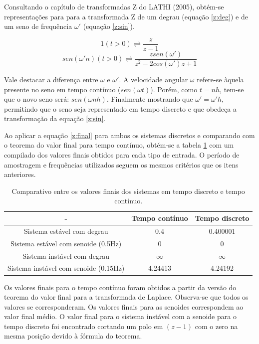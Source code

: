 Consultando o capítulo de transformadas Z do LATHI (2005), obtém-se representações para para a transformada Z de um degrau (equação \ref{z:deg}) e de um seno de frequência $\omega'$ (equação \ref{z:sin}).

\begin{equation} \label{z:deg}
    1 (t>0) \rightleftharpoons \frac{z}{z-1}
\end{equation}
\begin{equation} \label{z:sin}
   sen(\omega' n) (t>0) \rightleftharpoons \frac{z sen(\omega')}{z^2-2cos(\omega')z+1}
\end{equation}

Vale destacar a diferença entre $\omega$ e $\omega'$. A velocidade angular $\omega$ refere-se àquela presente no seno em tempo contínuo ($sen(\omega t)$). Porém, como $t = n h$, tem-se que o novo seno será: $sen(\omega n h)$. Finalmente mostrando que $\omega' = \omega' h$, permitindo que o seno seja representado em tempo discreto e que obedeça a transformação da equação \ref{z:sin}.

Ao aplicar a equação \ref{z:final} para ambos os sistemas discretos e comparando com o teorema do valor final para tempo contínuo, obtém-se a tabela \ref{table:1} com um compilado dos valores finais obtidos para cada tipo de entrada. O período de amostragem e frequências utilizados seguem os mesmos critérios que os itens anteriores.

\begin{table}[h]
\centering
\caption{Comparativo entre os valores finais dos sistemas em tempo discreto e tempo contínuo. }\label{table:1}
\begin{tabular}{c|cc}
 - & Tempo contínuo & Tempo discreto \\ \hline
Sistema estável com degrau & 0.4 & 0.400001  \\
Sistema estável com senoide (0.5Hz) & 0 & 0  \\
Sistema instável com degrau & $\infty$ & $\infty$  \\
Sistema instável com senoide (0.15Hz) &4.24413 & 4.24192 \\ \hline
\end{tabular}
\end{table}

Os valores finais para o tempo contínuo foram obtidos a partir da versão do teorema do valor final para a transformada de Laplace. Observa-se que todos os valores se corresponderam. Os valores finais para as senoides correspondem ao valor final médio. O valor final para o sistema instável com a senoide para o tempo discreto foi encontrado cortando um polo em $(z-1)$ com o zero na mesma posição devido à fórmula do teorema.


